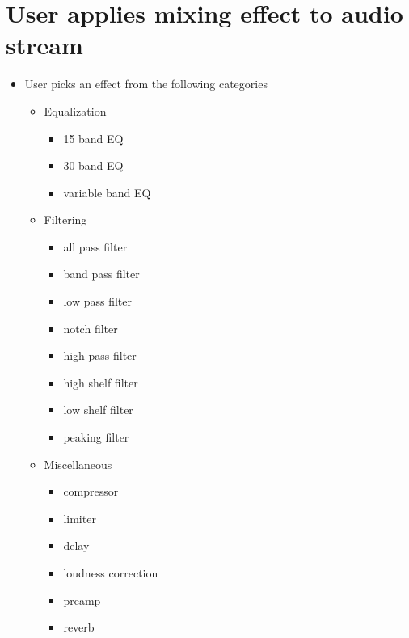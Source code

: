 \section{User applies mixing effect to audio stream}

\begin{itemize}

	\item User picks an effect from the following categories
	\begin{itemize}
		\item Equalization
		\begin{itemize}
			\item 15 band EQ
			\item 30 band EQ
			\item variable band EQ
		\end{itemize}

		\item Filtering
		\begin{itemize}
			\item all pass filter
			\item band pass filter
			\item low pass filter
			\item notch filter
			\item high pass filter
			\item high shelf filter
			\item low shelf filter
			\item peaking filter
		\end{itemize}

		\item Miscellaneous
		\begin{itemize}
			\item compressor
			\item limiter
			\item delay
			\item loudness correction
			\item preamp
			\item reverb
		\end{itemize}
	\end{itemize}


\end{itemize}